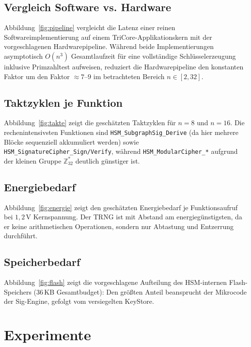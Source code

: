 ﻿\documentclass[a4paper,12pt]{article}
\theoremstyle{definition}
\begin{document}
\subsection{Vergleich Software vs. Hardware}

Abbildung~\ref{fig:pipeline} vergleicht die Latenz einer reinen Softwareimplementierung auf einem TriCore-Applikationskern mit der vorgeschlagenen Hardwarepipeline. Während beide Implementierungen asymptotisch $O(n^3)$ Gesamtlaufzeit für eine vollständige Schlüsselerzeugung inklusive Primzahltest aufweisen, reduziert die Hardwarepipeline den konstanten Faktor um den Faktor $\approx 7$--$9$ im betrachteten Bereich $n \in [2,32]$.

\subsection{Taktzyklen je Funktion}

Abbildung~\ref{fig:takte} zeigt die geschätzten Taktzyklen für $n=8$ und $n=16$. Die rechenintensivsten Funktionen sind \texttt{HSM\_SubgraphSig\_Derive} (da hier mehrere Blöcke sequenziell akkumuliert werden) sowie \texttt{HSM\_SignatureCipher\_Sign/Verify}, während \texttt{HSM\_ModularCipher\_*} aufgrund der kleinen Gruppe $\mathbb{Z}_{32}^*$ deutlich günstiger ist.

\subsection{Energiebedarf}

Abbildung~\ref{fig:energie} zeigt den geschätzten Energiebedarf je Funktionsaufruf bei $1{,}2\,$V Kernspannung. Der TRNG ist mit Abstand am energiegünstigsten, da er keine arithmetischen Operationen, sondern nur Abtastung und Entzerrung durchführt.

\subsection{Speicherbedarf}

Abbildung~\ref{fig:flash} zeigt die vorgeschlagene Aufteilung des HSM-internen Flash-Speichers (36\,KB Gesamtbudget): Den größten Anteil beansprucht der Mikrocode der Sig-Engine, gefolgt vom versiegelten KeyStore.

\section{Experimente}
\label{sec:experimente}
\end{document}

